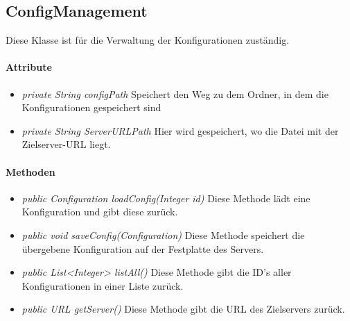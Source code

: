 
\subsection{ConfigManagement}
Diese Klasse ist für die Verwaltung der Konfigurationen zuständig.
\paragraph{Attribute}
\begin{itemize}
	\item \textit{private String configPath} Speichert den Weg zu dem Ordner, in dem die Konfigurationen gespeichert sind
	
	\item \textit{private String ServerURLPath} Hier wird gespeichert, wo die Datei mit der Zielserver-URL liegt.		
\end{itemize}

\paragraph{Methoden}
\begin{itemize}
	\item \textit{public Configuration loadConfig(Integer id)} Diese Methode lädt eine Konfiguration und gibt diese zurück.
	
	\item \textit{public void saveConfig(Configuration)} Diese Methode speichert die übergebene Konfiguration auf der Festplatte des Servers.
	
	\item \textit{public List<Integer> listAll()} Diese Methode gibt die ID's aller Konfigurationen in einer Liste zurück.
	
	\item \textit{public URL getServer()} Diese Methode gibt die URL des Zielservers zurück.
\end{itemize}